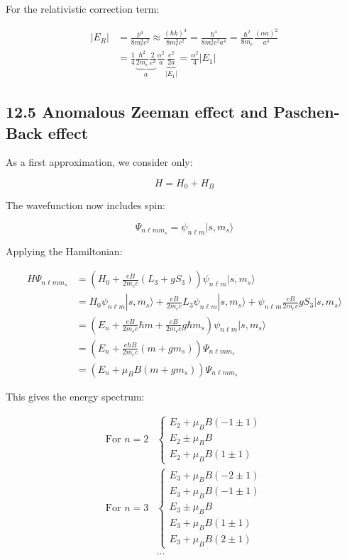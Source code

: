 \documentclass[italian]{HKNdocument}
\begin{document}
For the relativistic correction term:

\begin{align*}
|E_R| &= \frac{p^4}{8m_e^3c^2} \approx \frac{(\hbar k)^4}{8m_e^3c^2}=\frac{\hbar^4}{8m_e^3c^2a^4}=\frac{\hbar^2}{8m_e}\frac{(\alpha a)^2}{a^4}\\
&= \frac{1}{4}\underbrace{\frac{\hbar^2}{2m_e}\frac{2}{e^2}}_a\frac{\alpha^2}{a}\underbrace{\frac{e^2}{2a}}_{|E_1|}=\frac{\alpha^2}{4}|E_1| \tag{12.42}
\end{align*}

\subsection*{12.5 Anomalous Zeeman effect and Paschen-Back effect}
As a first approximation, we consider only:

\begin{equation*}
H=H_0+H_B \tag{12.43}
\end{equation*}

The wavefunction now includes spin:

\begin{equation*}
\Psi_{n\ell mm_s}=\psi_{n\ell m}|s,m_s\rangle \tag{12.44}
\end{equation*}

Applying the Hamiltonian:

\begin{align*}
H\Psi_{n\ell mm_s} &= (H_0+\frac{eB}{2m_e c}(L_3+gS_3))\psi_{n\ell m}|s,m_s\rangle\\
&= H_0\psi_{n\ell m}|s,m_s\rangle+\frac{eB}{2m_e c}L_3\psi_{n\ell m}|s,m_s\rangle+\psi_{n\ell m}\frac{eB}{2m_e c}gS_3|s,m_s\rangle\\
&= (E_n+\frac{eB}{2m_e c}\hbar m+\frac{eB}{2m_e c}g\hbar m_s)\psi_{n\ell m}|s,m_s\rangle\\
&= (E_n+\frac{e\hbar B}{2m_e c}(m+gm_s))\Psi_{n\ell mm_s}\\
&= (E_n+\mu_B B(m+gm_s))\Psi_{n\ell mm_s} \tag{12.45}
\end{align*}

This gives the energy spectrum:

\begin{align*}
\text{For } n=2&\left\{\begin{array}{l}
E_2+\mu_B B(-1\pm 1)\\
E_2\pm\mu_B B\\
E_2+\mu_B B(1\pm 1)
\end{array}\right.\\
\text{For } n=3&\left\{\begin{array}{l}
E_3+\mu_B B(-2\pm 1)\\
E_3+\mu_B B(-1\pm 1)\\
E_3\pm\mu_B B\\
E_3+\mu_B B(1\pm 1)\\
E_3+\mu_B B(2\pm 1)
\end{array}\right.\tag{12.46}\\
&\ldots
\end{align*}
\end{document}
